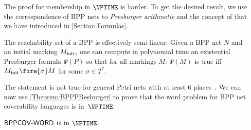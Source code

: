 \documentclass[../../diss.tex]{subfiles}
\begin{document}
The proof for membership in $\NPTIME$ is harder.
To get the desired result, we use the correspondence of BPP nets to \textit{Presburger arithmetic} and the concept of  that we have introduced in \cref{Section:Formulas}.

\begin{theorem}%
\label{Theorem:BPPPResburger}%
    The reachability set of a BPP is effectively semi-linear:
    Given a BPP net $N$ and an initial marking $M_{\text{init}}$, one can compute in polynomial time an existential Presburger formula $\Psi(P)$ so that for all markings $M$: $\Psi(M)$ is true iff $\Minit \fire{\sigma} M$ for some $\sigma \in T^*$.
\end{theorem}

The statement is not true for general Petri nets with at least 6 places~\cite{HopcroftP79}.
We can now use \cref{Theorem:BPPPResburger} to prove that the word problem for BPP net coverability languages is in~$\NPTIME$.

\begin{proposition}%
\label{Proposition:BPPWordproblem}%
    $\mathsf{BPPCOV\text{-}WORD}$ is in $\NPTIME$.
\end{proposition}
\end{document}
